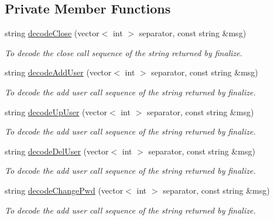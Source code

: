\subsection*{Private Member Functions}
\begin{DoxyCompactItemize}
\item 
string \hyperlink{classUMSMapper_a145a0e6311e595394f5f07da1a3a989b}{decodeClose} (vector$<$ int $>$ separator, const string \&msg)
\begin{DoxyCompactList}\small\item\em To decode the close call sequence of the string returned by finalize. \item\end{DoxyCompactList}\item 
string \hyperlink{classUMSMapper_a1f5caa2c4e02967efb3dc741813831a7}{decodeAddUser} (vector$<$ int $>$ separator, const string \&msg)
\begin{DoxyCompactList}\small\item\em To decode the add user call sequence of the string returned by finalize. \item\end{DoxyCompactList}\item 
string \hyperlink{classUMSMapper_afc32e4e8ec824a76c57577d234a46f7c}{decodeUpUser} (vector$<$ int $>$ separator, const string \&msg)
\begin{DoxyCompactList}\small\item\em To decode the add user call sequence of the string returned by finalize. \item\end{DoxyCompactList}\item 
string \hyperlink{classUMSMapper_a63cdc4905b7ad965c410cdccff455329}{decodeDelUser} (vector$<$ int $>$ separator, const string \&msg)
\begin{DoxyCompactList}\small\item\em To decode the add user call sequence of the string returned by finalize. \item\end{DoxyCompactList}\item 
string \hyperlink{classUMSMapper_afc9f56ce3627876213876ebbb0c3cedb}{decodeChangePwd} (vector$<$ int $>$ separator, const string \&msg)
\begin{DoxyCompactList}\small\item\em To decode the add user call sequence of the string returned by finalize. \item\end{DoxyCompactList}\item 

\end{DoxyCompactItemize}
